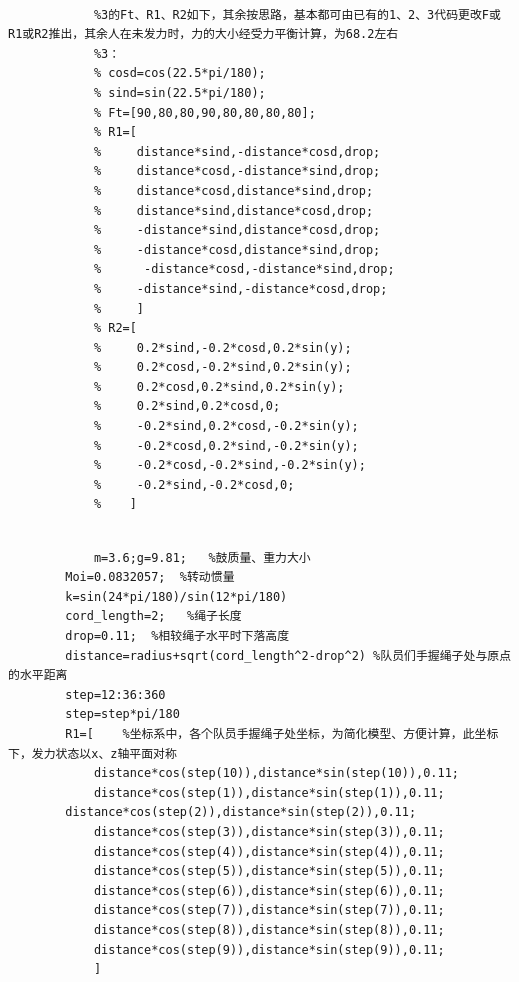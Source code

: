 \documentclass[UTF8]{article}
\begin{document}
\begin{appendices}
\begin{verbatim}
            
            %3的Ft、R1、R2如下，其余按思路，基本都可由已有的1、2、3代码更改F或R1或R2推出，其余人在未发力时，力的大小经受力平衡计算，为68.2左右
            %3：
            % cosd=cos(22.5*pi/180);
            % sind=sin(22.5*pi/180);
            % Ft=[90,80,80,90,80,80,80,80];
            % R1=[
            %     distance*sind,-distance*cosd,drop;
            %     distance*cosd,-distance*sind,drop;
            %     distance*cosd,distance*sind,drop;
            %     distance*sind,distance*cosd,drop;
            %     -distance*sind,distance*cosd,drop;
            %     -distance*cosd,distance*sind,drop;
            %      -distance*cosd,-distance*sind,drop;
            %     -distance*sind,-distance*cosd,drop; 
            %     ]
            % R2=[
            %     0.2*sind,-0.2*cosd,0.2*sin(y);
            %     0.2*cosd,-0.2*sind,0.2*sin(y);
            %     0.2*cosd,0.2*sind,0.2*sin(y);
            %     0.2*sind,0.2*cosd,0;
            %     -0.2*sind,0.2*cosd,-0.2*sin(y);
            %     -0.2*cosd,0.2*sind,-0.2*sin(y);
            %     -0.2*cosd,-0.2*sind,-0.2*sin(y);
            %     -0.2*sind,-0.2*cosd,0;
            %    ]
  
\end{verbatim}

\centerline{}
 \begin{verbatim}
            m=3.6;g=9.81;   %鼓质量、重力大小
        Moi=0.0832057;  %转动惯量
        k=sin(24*pi/180)/sin(12*pi/180)
        cord_length=2;   %绳子长度
        drop=0.11;  %相较绳子水平时下落高度
        distance=radius+sqrt(cord_length^2-drop^2) %队员们手握绳子处与原点的水平距离
        step=12:36:360
        step=step*pi/180
        R1=[    %坐标系中，各个队员手握绳子处坐标，为简化模型、方便计算，此坐标下，发力状态以x、z轴平面对称
            distance*cos(step(10)),distance*sin(step(10)),0.11;
            distance*cos(step(1)),distance*sin(step(1)),0.11;
        distance*cos(step(2)),distance*sin(step(2)),0.11;
            distance*cos(step(3)),distance*sin(step(3)),0.11;
            distance*cos(step(4)),distance*sin(step(4)),0.11;
            distance*cos(step(5)),distance*sin(step(5)),0.11;
            distance*cos(step(6)),distance*sin(step(6)),0.11;
            distance*cos(step(7)),distance*sin(step(7)),0.11;
            distance*cos(step(8)),distance*sin(step(8)),0.11;
            distance*cos(step(9)),distance*sin(step(9)),0.11;
            ]


\end{verbatim}
\end{appendices}
\end{document}
